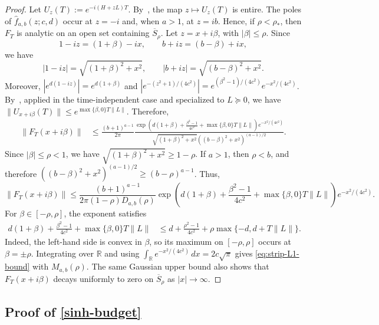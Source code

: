 \documentclass[10pt,reqno]{article}
\numberwithin{equation}{section}
\theoremstyle{plain}
\theoremstyle{definition}
\begin{document}
\begin{proof}
Let \(U_z(T):=e^{-i(H+zL)T}\). By~\cite[Lemma~3]{low2025optimallchs}, the map \(z\mapsto U_z(T)\) is entire. The poles of \(\hat f_{a,b}(z;c,d)\) occur at \(z=-i\) and, when \(a>1\), at \(z=ib\). Hence, if \(\rho<\rho_\ast\), then \(F_T\) is analytic on an open set containing \(\overline S_\rho\). Let \(z=x+i\beta\), with \(|\beta|\le \rho\). Since
\begin{equation}
1-iz=(1+\beta)-ix, \qquad b+iz=(b-\beta)+ix,
\end{equation}
we have
\begin{equation}
|1-iz|=\sqrt{(1+\beta)^2+x^2}, \qquad |b+iz|=\sqrt{(b-\beta)^2+x^2}.
\end{equation}
Moreover, \(|e^{d(1-iz)}|=e^{d(1+\beta)}\) and \(|e^{-(z^2+1)/(4c^2)}|=e^{(\beta^2-1)/(4c^2)}e^{-x^2/(4c^2)}\). By~\cite[Lemma~4]{low2025optimallchs}, applied in the time-independent case and specialized to \(L\succeq0\), we have \(\|U_{x+i\beta}(T)\|\le e^{\max\{\beta,0\}T\|L\|}\). Therefore,
\begin{align}
\|F_T(x+i\beta)\| &\le \frac{(b+1)^{a-1}}{2\pi}\frac{\exp\left(d(1+\beta)+\frac{\beta^2-1}{4c^2}+\max\{\beta,0\}T\|L\|\right)e^{-x^2/(4c^2)}}{\sqrt{(1+\beta)^2+x^2}\left((b-\beta)^2+x^2\right)^{(a-1)/2}}.
\end{align}
Since \(|\beta|\le \rho<1\), we have \(\sqrt{(1+\beta)^2+x^2}\ge 1-\rho\). If \(a>1\), then \(\rho<b\), and therefore \(\left((b-\beta)^2+x^2\right)^{(a-1)/2}\ge (b-\rho)^{a-1}\). Thus,
\begin{equation}
\|F_T(x+i\beta)\| \le \frac{(b+1)^{a-1}}{2\pi(1-\rho)D_{a,b}(\rho)}\exp\left(d(1+\beta)+\frac{\beta^2-1}{4c^2}+\max\{\beta,0\}T\|L\|\right)e^{-x^2/(4c^2)}.
\end{equation}
For \(\beta\in[-\rho,\rho]\), the exponent satisfies
\begin{align}
d(1+\beta)+\frac{\beta^2-1}{4c^2}+\max\{\beta,0\}T\|L\| &\le d+\frac{\rho^2-1}{4c^2}+\rho\max\{-d,d+T\|L\|\}.
\end{align}
Indeed, the left-hand side is convex in \(\beta\), so its maximum on \([-\rho,\rho]\) occurs at \(\beta=\pm\rho\). Integrating over \(\mathbb R\) and using \(\int_{\mathbb R} e^{-x^2/(4c^2)}\,dx = 2c\sqrt{\pi}\) gives \cref{eq:strip-L1-bound} with \(M_{a,b}(\rho)\). The same Gaussian upper bound also shows that \(F_T(x+i\beta)\) decays uniformly to zero on \(\overline S_\rho\) as \(|x|\to\infty\).
\end{proof}

\subsection{Proof of \cref{sinh-budget}}\label{proof-of-sinh-budget}
\end{document}
